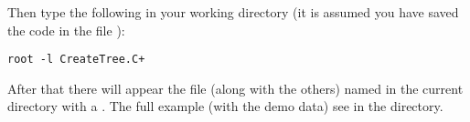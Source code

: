 Then type the following in your working directory (it is assumed you have saved the code in the file ):
\begin{lstlisting}
root -l CreateTree.C+
\end{lstlisting}
After that there will appear the file (along with the others) named  in the current directory with a . The full example (with the demo data)
see in the  directory.
